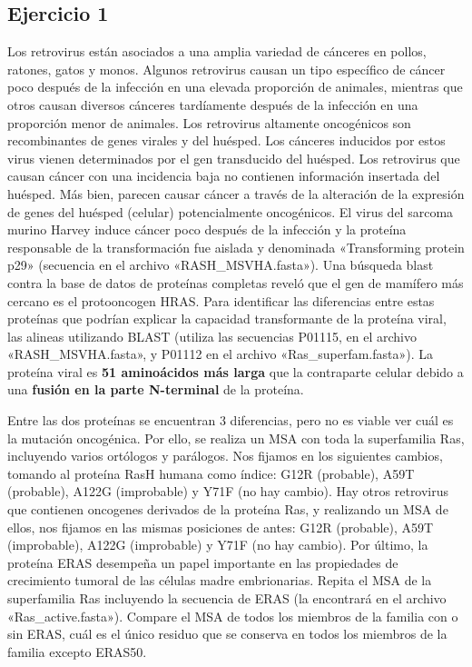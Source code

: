 \subsection{Ejercicio 1}
Los retrovirus están asociados a una amplia variedad de cánceres en pollos, ratones, gatos y monos. Algunos retrovirus causan un tipo específico de cáncer poco después de la infección en una elevada proporción de animales, mientras que otros causan diversos cánceres tardíamente después de la infección en una proporción menor de animales.
Los retrovirus altamente oncogénicos son recombinantes de genes virales y del huésped. Los cánceres inducidos por estos virus vienen determinados por el gen transducido del huésped.
Los retrovirus que causan cáncer con una incidencia baja no contienen información insertada del huésped. Más bien, parecen causar cáncer a través de la alteración de la expresión de genes del huésped (celular) potencialmente oncogénicos.
El virus del sarcoma murino Harvey induce cáncer poco después de la infección y la proteína responsable de la transformación fue aislada y denominada «Transforming protein p29» (secuencia en el archivo «RASH\_MSVHA.fasta»). Una búsqueda blast contra la base de datos de proteínas completas reveló que el gen de mamífero más cercano es el protooncogen HRAS. Para identificar las diferencias entre estas proteínas que podrían explicar la capacidad transformante de la proteína viral, las alineas utilizando BLAST (utiliza las secuencias P01115, en el archivo «RASH\_MSVHA.fasta», y P01112 en el archivo «Ras\_superfam.fasta»). La proteína viral es \textbf{51 aminoácidos más larga} que la contraparte celular debido a una \textbf{fusión en la parte N-terminal} de la proteína. 

Entre las dos proteínas se encuentran 3 diferencias, pero no es viable ver cuál es la mutación oncogénica. Por ello, se realiza un MSA con toda la superfamilia Ras, incluyendo varios ortólogos y parálogos. Nos fijamos en los siguientes cambios, tomando al proteína RasH humana como índice: G12R (probable), A59T (probable), A122G (improbable) y Y71F (no hay cambio). Hay otros retrovirus que contienen oncogenes derivados de la proteína Ras, y realizando un MSA de ellos, nos fijamos en las mismas posiciones de antes: G12R (probable), A59T (improbable), A122G (improbable) y Y71F (no hay cambio). Por último, la proteína ERAS desempeña un papel importante en las propiedades de crecimiento tumoral de las células madre embrionarias. Repita el MSA de la superfamilia Ras incluyendo la secuencia de ERAS (la encontrará en el archivo «Ras\_active.fasta»). Compare el MSA de todos los miembros de la familia con o sin ERAS, cuál es el único residuo que se conserva en todos los miembros de la familia excepto ERAS50.

